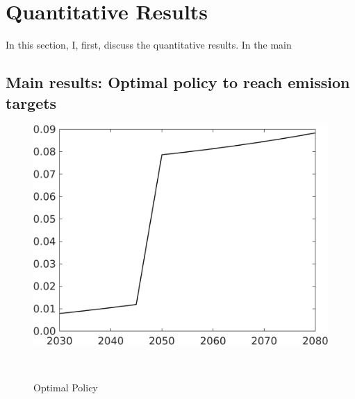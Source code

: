 \section{Quantitative Results}

In this section, I, first, discuss the quantitative results.
In the main 

\subsection{Main results: Optimal policy to reach emission targets}
\begin{figure}[h!!]
	\centering
	\caption{Optimal Policy }\label{fig:optPol}
	\begin{minipage}[]{0.4\textwidth}
		\includegraphics[width=1\textwidth]{../../codding_model/own_basedOnFried/optimalPol_elastS_DisuSci/figures/all_1705/Single_OPT_T_NoTaus_taul_spillover0_sep1_etaa1.00.png}
	\end{minipage}
\begin{minipage}[]{0.1\textwidth}
\
\end{minipage}
	\begin{minipage}[]{0.4\textwidth}

\end{minipage}
\end{figure}
